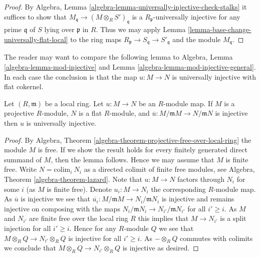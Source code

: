 \begin{proof}
By
Algebra, Lemma \ref{algebra-lemma-universally-injective-check-stalks}
it suffices to show that $M_{\mathfrak q} \to (M \otimes_R S')_{\mathfrak q}$
is a $R_{\mathfrak p}$-universally injective for any prime $\mathfrak q$
of $S$ lying over $\mathfrak p$ in $R$. Thus we may apply
Lemma \ref{lemma-base-change-universally-flat-local}
to the ring maps
$R_{\mathfrak p} \to S_{\mathfrak q} \to S'_{\mathfrak q}$
and the module $M_{\mathfrak q}$.
\end{proof}

\noindent
The reader may want to compare the following lemma to
Algebra, Lemma \ref{algebra-lemma-mod-injective} and
Lemma \ref{algebra-lemma-mod-injective-general}.
In each case the conclusion is that the map $u : M \to N$ is
universally injective with flat cokernel.

\begin{lemma}
\label{lemma-universally-injective-local}
Let $(R, \mathfrak m)$ be a local ring. Let $u : M \to N$ be an $R$-module map.
If $M$ is a projective $R$-module, $N$ is a flat $R$-module, and
$\overline{u} : M/\mathfrak mM \to N/\mathfrak mN$ is injective
then $u$ is universally injective.
\end{lemma}

\begin{proof}
By
Algebra, Theorem \ref{algebra-theorem-projective-free-over-local-ring}
the module $M$ is free. If we show the result holds for every finitely
generated direct summand of $M$, then the lemma follows. Hence we may
assume that $M$ is finite free. Write $N = \text{colim}_i\ N_i$ as
a directed colimit of finite free modules, see
Algebra, Theorem \ref{algebra-theorem-lazard}.
Note that $u : M \to N$ factors through $N_i$ for some $i$ (as $M$ is finite
free). Denote $u_i : M \to N_i$ the corresponding $R$-module map.
As $\overline{u}$ is injective we see that
$\overline{u_i} : M/\mathfrak mM \to N_i/\mathfrak mN_i$ is
injective and remains injective on composing with the maps
$N_i/\mathfrak mN_i \to N_{i'}/\mathfrak mN_{i'}$ for all $i' \geq i$.
As $M$ and $N_{i'}$ are finite free over the local ring $R$ this implies
that $M \to N_{i'}$ is a split injection for all $i' \geq i$. Hence
for any $R$-module $Q$ we see that $M \otimes_R Q \to N_{i'} \otimes_R Q$
is injective for all $i' \geq i$. As $- \otimes_R Q$ commutes with
colimits we conclude that $M \otimes_R Q \to N_{i'} \otimes_R Q$
is injective as desired.
\end{proof}

